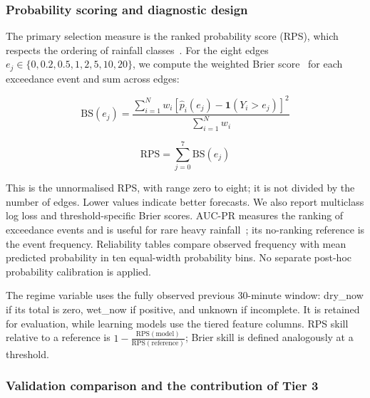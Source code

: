 \documentclass[11pt,a4paper]{article}
\begin{document}
\subsubsection*{Probability scoring and diagnostic design}
{}


The primary selection measure is the ranked probability score (RPS), which respects the ordering of rainfall classes~\citep{epstein1969}. For the eight edges \(e_j\in\{0,0.2,0.5,1,2,5,10,20\}\), we compute the weighted Brier score~\citep{brier1950} for each exceedance event and sum across edges:


\[
\mathrm{BS}(e_j)=\frac{\sum_{i=1}^{N}w_i[\widehat p_i(e_j)-\mathbf{1}(Y_i>e_j)]^2}{\sum_{i=1}^{N}w_i}
\]


\[
\mathrm{RPS}=\sum_{j=0}^{7}\mathrm{BS}(e_j)
\]


This is the unnormalised RPS, with range zero to eight; it is not divided by the number of edges. Lower values indicate better forecasts. We also report multiclass log loss and threshold-specific Brier scores. AUC-PR measures the ranking of exceedance events and is useful for rare heavy rainfall~\citep{saito2015}; its no-ranking reference is the event frequency. Reliability tables compare observed frequency with mean predicted probability in ten equal-width probability bins. No separate post-hoc probability calibration is applied.


The regime variable uses the fully observed previous 30-minute window: dry\_now if its total is zero, wet\_now if positive, and unknown if incomplete. It is retained for evaluation, while learning models use the tiered feature columns. RPS skill relative to a reference is \(1-\frac{\mathrm{RPS}(\text{model})}{\mathrm{RPS}(\text{reference})}\); Brier skill is defined analogously at a threshold. 


\subsubsection*{Validation comparison and the contribution of Tier 3}
{}
\end{document}
